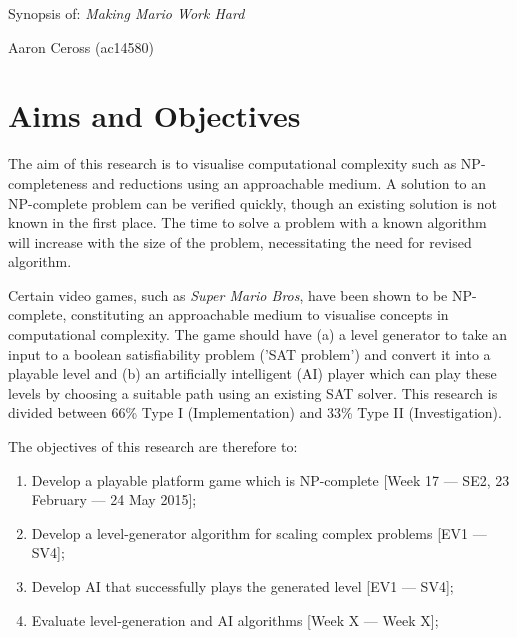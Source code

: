 \documentclass[a4paper]{article}
\begin{document}
\begin{center}\Huge Synopsis of: \textit{Making Mario Work Hard}
\par \Large Aaron Ceross (ac14580)
\end{center}

\section{Aims and Objectives}

The aim of this research is to visualise computational complexity such as NP-completeness and reductions using an approachable medium. A solution to an NP-complete problem can be verified quickly, though an existing solution is not known in the first place. The time to solve a problem with a known algorithm will increase with the size of the problem, necessitating the need for revised algorithm. 
\par \noindent Certain video games, such as \textit{Super Mario Bros}, have been shown to be NP-complete, constituting an approachable medium to visualise concepts in computational complexity. The game should have (a) a level generator to take an input to a boolean satisfiability problem ('SAT problem') and convert it into a playable level and (b) an artificially intelligent (AI) player which can play these levels by choosing a suitable path using an existing SAT solver. This research is divided between 66\% Type I (Implementation) and 33\% Type II (Investigation). 
\par \noindent The objectives of this research are therefore to:
\begin{enumerate}
  \item Develop a playable platform game which is NP-complete [Week 17 --- SE2, 23 February --- 24 May 2015];
  \item Develop a level-generator algorithm for scaling complex problems [EV1 --- SV4];
  \item Develop AI that successfully plays the generated level [EV1 --- SV4];
  \item Evaluate level-generation  and AI algorithms [Week X --- Week X];
\end{enumerate}
\end{document}
